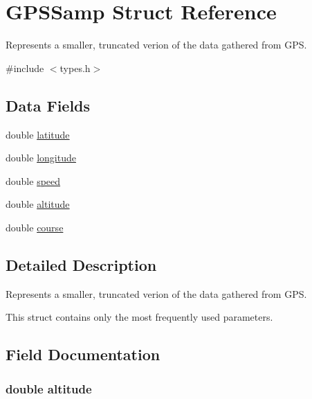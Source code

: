 \hypertarget{struct_g_p_s_samp}{}\section{G\+P\+S\+Samp Struct Reference}
\label{struct_g_p_s_samp}


Represents a smaller, truncated verion of the data gathered from G\+PS.  




{\ttfamily \#include $<$types.\+h$>$}

\subsection*{Data Fields}
\begin{DoxyCompactItemize}
\item 
double \hyperlink{struct_g_p_s_samp_a76714bdbc5c536fa77dfb14533ff82a9}{latitude}
\item 
double \hyperlink{struct_g_p_s_samp_ac155e35fdeebafc89723a51520fb9fe6}{longitude}
\item 
double \hyperlink{struct_g_p_s_samp_a6dc6e6f3c75c509ce943163afb5dade7}{speed}
\item 
double \hyperlink{struct_g_p_s_samp_a2b13d276aee0d9fd646c8fa3647e869b}{altitude}
\item 
double \hyperlink{struct_g_p_s_samp_acaa2fde7e3fad7df8f5755347603d17b}{course}
\end{DoxyCompactItemize}


\subsection{Detailed Description}
Represents a smaller, truncated verion of the data gathered from G\+PS. 

This struct contains only the most frequently used parameters. 

\subsection{Field Documentation}
\subsubsection[{\texorpdfstring{altitude}{altitude}}]{\setlength{\rightskip}{0pt plus 5cm}double altitude}\hypertarget{struct_g_p_s_samp_a2b13d276aee0d9fd646c8fa3647e869b}{}\label{struct_g_p_s_samp_a2b13d276aee0d9fd646c8fa3647e869b}
